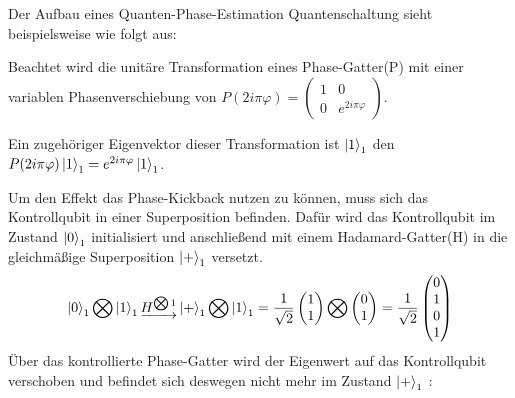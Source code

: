 Der Aufbau eines Quanten-Phase-Estimation Quantenschaltung sieht beispielsweise wie folgt aus:

Beachtet wird die unitäre Transformation eines Phase-Gatter(P) mit einer variablen Phasenverschiebung von 
\(P(2 i \pi \varphi ) = 
\begin{pmatrix}
  1 & 0\\
  0 & e^{2 i \pi \varphi}
\end{pmatrix}\).

Ein zugehöriger Eigenvektor dieser Transformation ist \(\ket{1}_1\) den \(P(2 i \pi \varphi)\ket{1}_1 = e^{2 i \pi \varphi} \ket{1}_1\).

Um den Effekt das Phase-Kickback nutzen zu können, muss sich das Kontrollqubit in einer Superposition befinden.
Dafür wird das Kontrollqubit im Zustand \(\ket{0}_1\) initialisiert und
anschließend mit einem Hadamard-Gatter(H) in die gleichmäßige Superposition \(\ket{+}_1\) versetzt.
\[\ket{0}_1 \bigotimes \ket{1}_1 
\underrightarrow{H^{\bigotimes 1}}
 \ket{+}_1 \bigotimes \ket{1}_1
=
\frac{1}{\sqrt{2}}
\begin{pmatrix}
  1 \\
  1
 \end{pmatrix}
 \bigotimes
 \begin{pmatrix}
  0 \\
  1 
 \end{pmatrix}
 =
 \frac{1}{\sqrt{2}}
 \begin{pmatrix}
  0 \\
  1 \\
  0 \\
  1
\end{pmatrix}
 \]
Über das kontrollierte Phase-Gatter wird der Eigenwert auf das Kontrollqubit verschoben und
befindet sich deswegen nicht mehr im Zustand \(\ket{+}_1\) :
